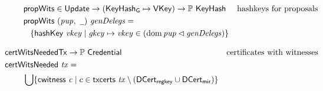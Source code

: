 \begin{figure}[htb]
  \begin{align*}
    & \fun{propWits} \in \Update \to (\KeyHashGen\mapsto\VKey) \to \powerset{\KeyHash}
    & \text{hashkeys for proposals} \\
    & \fun{propWits}~(\var{pup},~\wcard)~\var{genDelegs} = \\
    & ~~\left\{
      \hashKey{vkey}
      \mid
      \var{gkey}\mapsto\var{vkey}\in
      \left(\dom{\var{pup}}\restrictdom\var{genDelegs}\right)
      \right\}
  \end{align*}

  \begin{align*}
    & \hspace{-0.8cm}\fun{certWitsNeeded} \Tx \to \powerset{\Credential}
    & \text{certificates with witnesses} \\
    &  \hspace{-0.8cm}\fun{certWitsNeeded}~\var{tx} = \\
    & \bigcup\{\cwitness{c} \mid c \in \txcerts{tx} \setminus (\DCertRegKey\cup\DCertMir)\}
  \end{align*}


\end{figure}
